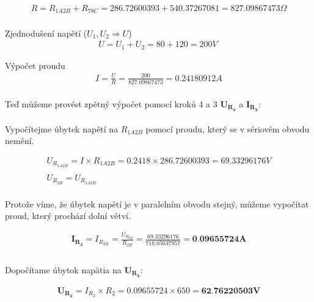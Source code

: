 \begin{gather*}
    R = R_{1A2B} + R_{78C} = 286.72600393 + 540.37267081 = 827.09867473 \Omega \\
\end{gather*}

Zjednodušení napětí
($U_1, U_2 \Rightarrow U$)
\begin{gather*}
    U = U_1 + U_2 = 80 + 120 = 200 V \
\end{gather*}

Výpočet proudu
\begin{gather*}
    I = \frac{U}{R} = \frac{200}{827.09867473} = 0.24180912 A \\
\end{gather*}

\newpage

\noindent Teď můžeme provést zpětný výpočet pomocí kroků 4 a 3 $\boldsymbol{U_{R_2}}$ a $\boldsymbol{I_{R_2}}$:
\\\\
Vypočítejme úbytek napětí na $R_{1A2B}$ pomocí proudu, který se v sériovém obvodu nemění.

\begin{gather*}
    U_{R_{1A2B}} = I \times R_{1A2B} = 0.2418 \times 286.72600393 = 69.33296176 V \\\\
    U_{R_{2B}} = U_{R_{1A2B}} \\
\end{gather*}

\noindent Protože víme, že úbytek napětí je v paralelním obvodu stejný, můžeme vypočítat proud, který prochází dolní větví.

\begin{gather*}
    \boldsymbol{I_{R_2}} = I_{R_{2B}} = \frac{U_{R_{2B}}}{R_{2B}} =
    \frac{69.33296176}{718.05037957} =
    \textbf{0.09655724A} \\\\
\end{gather*}

\noindent Dopočítame úbytok napätia na $\boldsymbol{U_{R_2}}$:

\begin{gather*}
    \boldsymbol{U_{R_2}} = I_{R_2} \times R_2 = 0.09655724 \times 650 = \textbf{62.76220503V}
\end{gather*}

